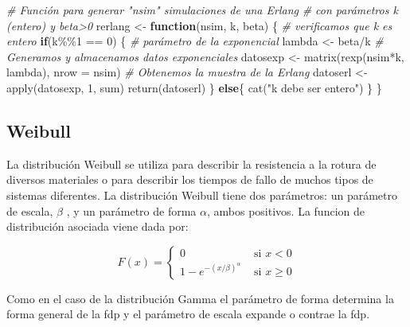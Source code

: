 \documentclass[
]{book}
\newenvironment{Shaded}{\begin{snugshade}}{\end{snugshade}}
\newcommand{\AttributeTok}[1]{\textcolor[rgb]{0.77,0.63,0.00}{#1}}
\newcommand{\CommentTok}[1]{\textcolor[rgb]{0.56,0.35,0.01}{\textit{#1}}}
\newcommand{\ControlFlowTok}[1]{\textcolor[rgb]{0.13,0.29,0.53}{\textbf{#1}}}
\newcommand{\DecValTok}[1]{\textcolor[rgb]{0.00,0.00,0.81}{#1}}
\newcommand{\FunctionTok}[1]{\textcolor[rgb]{0.00,0.00,0.00}{#1}}
\newcommand{\NormalTok}[1]{#1}
\newcommand{\OtherTok}[1]{\textcolor[rgb]{0.56,0.35,0.01}{#1}}
\newcommand{\SpecialCharTok}[1]{\textcolor[rgb]{0.00,0.00,0.00}{#1}}
\newcommand{\StringTok}[1]{\textcolor[rgb]{0.31,0.60,0.02}{#1}}
\theoremstyle{definition}
\theoremstyle{definition}
\theoremstyle{definition}
\theoremstyle{definition}
\theoremstyle{remark}
\begin{document}
\begin{Shaded}
\begin{Highlighting}[]
\CommentTok{\# Función para generar "nsim" simulaciones de una Erlang }
\CommentTok{\# con parámetros k (entero) y beta\textgreater{}0}
\NormalTok{rerlang }\OtherTok{\textless{}{-}} \ControlFlowTok{function}\NormalTok{(nsim, k, beta)}
\NormalTok{\{}
  \CommentTok{\# verificamos que k es entero}
  \ControlFlowTok{if}\NormalTok{(k}\SpecialCharTok{\%\%}\DecValTok{1} \SpecialCharTok{==} \DecValTok{0}\NormalTok{)}
\NormalTok{  \{}
    \CommentTok{\# parámetro de la exponencial}
\NormalTok{    lambda }\OtherTok{\textless{}{-}}\NormalTok{ beta}\SpecialCharTok{/}\NormalTok{k}
    \CommentTok{\# Generamos y almacenamos datos exponenciales}
\NormalTok{    datosexp }\OtherTok{\textless{}{-}} \FunctionTok{matrix}\NormalTok{(}\FunctionTok{rexp}\NormalTok{(nsim}\SpecialCharTok{*}\NormalTok{k, lambda), }\AttributeTok{nrow =}\NormalTok{ nsim)}
    \CommentTok{\# Obtenemos la muestra de la Erlang}
\NormalTok{    datoserl }\OtherTok{\textless{}{-}} \FunctionTok{apply}\NormalTok{(datosexp, }\DecValTok{1}\NormalTok{, sum)}
    \FunctionTok{return}\NormalTok{(datoserl)}
\NormalTok{  \}}
  \ControlFlowTok{else}\NormalTok{\{}
    \FunctionTok{cat}\NormalTok{(}\StringTok{"k debe ser entero"}\NormalTok{)}
\NormalTok{  \}}
\NormalTok{\}}
\end{Highlighting}
\end{Shaded}

\hypertarget{weibull}{%
\subsection{Weibull}\label{weibull}}

La distribución Weibull se utiliza para describir la resistencia a la rotura de diversos materiales o para describir los tiempos de fallo de muchos tipos de sistemas diferentes. La distribución Weibull tiene dos parámetros: un parámetro de escala, \(\beta\) , y un parámetro de forma \(\alpha\), ambos positivos. La funcion de distribución asociada viene dada por:

\begin{equation}
F(x) = 
\begin{cases}
0 & \text{ si } x < 0 \\
1 - e^{-(x/\beta)^{\alpha}} & \text{ si } x \geq 0
\end{cases}
\label{eq:var-weibull2}
\end{equation}

Como en el caso de la distribución Gamma el parámetro de forma determina la forma general de la fdp y el parámetro de escala expande o contrae la fdp.
\end{document}
